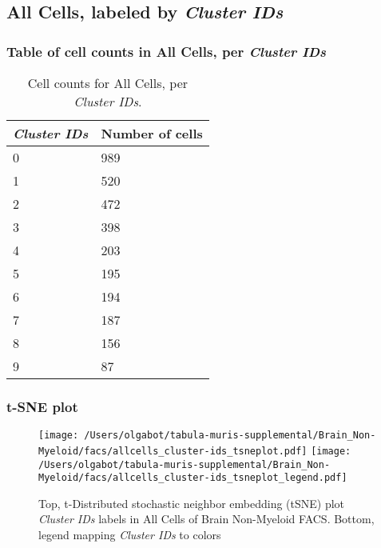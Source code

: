 \clearpage

\subsection{All Cells, labeled by \emph{Cluster IDs}}
\subsubsection{Table of cell counts in All Cells, per \emph{Cluster IDs}}\begin{table}[h]
\centering
\label{my-label}
\begin{tabular}{@{}ll@{}}
\toprule

\emph{Cluster IDs}& Number of cells \\ \midrule
0 & 989 \\

1 & 520 \\

2 & 472 \\

3 & 398 \\

4 & 203 \\

5 & 195 \\

6 & 194 \\

7 & 187 \\

8 & 156 \\

9 & 87 \\
\bottomrule
\end{tabular}
\caption{Cell counts for All Cells, per \emph{Cluster IDs}.}
\end{table}

\clearpage
\subsubsection{t-SNE plot}
\begin{figure}[h]
\centering
\texttt{[image: /Users/olgabot/tabula-muris-supplemental/Brain\_Non-Myeloid/facs/allcells\_cluster-ids\_tsneplot.pdf]}
\texttt{[image: /Users/olgabot/tabula-muris-supplemental/Brain\_Non-Myeloid/facs/allcells\_cluster-ids\_tsneplot\_legend.pdf]}
\caption{Top, t-Distributed stochastic neighbor embedding (tSNE) plot  \emph{Cluster IDs} labels in All Cells of Brain Non-Myeloid FACS. Bottom, legend mapping \emph{Cluster IDs} to colors}
\end{figure}


